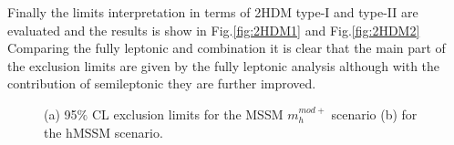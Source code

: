 Finally the limits interpretation in terms of 2HDM type-I and type-II are evaluated and the results is show in Fig.\ref{fig:2HDM1} and Fig.\ref{fig:2HDM2}
Comparing the fully leptonic and combination it is clear that the main part of the exclusion limits are given by the fully leptonic analysis 	
although with the contribution of semileptonic they are further improved.
\begin{figure}[htb]
\centering
{}
\caption{(a) 95$\%$ CL exclusion limits for the MSSM $m_h^{mod+}$ scenario (b) for the hMSSM scenario.}
    \label{fig:MSSM2}
\end{figure}


